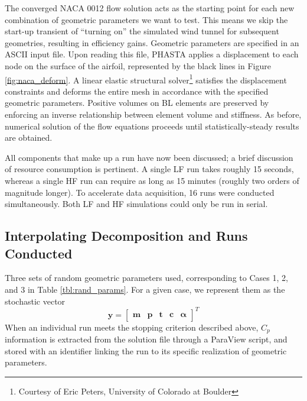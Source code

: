 \documentclass[11pt]{article}
\begin{document}
The converged NACA 0012 flow solution acts as the starting point for each new combination of geometric parameters we want to test. This means we skip the start-up transient of ``turning on'' the simulated wind tunnel for subsequent geometries, resulting in efficiency gains. Geometric parameters are specified in an ASCII input file. Upon reading this file, PHASTA applies a displacement to each node on the surface of the airfoil, represented by the black lines in Figure \ref{fig:naca_deform}. A linear elastic structural solver\footnote{Courtesy of Eric Peters, University of Colorado at Boulder} satisfies the displacement constraints and deforms the entire mesh in accordance with the specified geometric parameters. Positive volumes on BL elements are preserved by enforcing an inverse relationship between element volume and stiffness. As before, numerical solution of the flow equations proceeds until statistically-steady results are obtained.

All components that make up a run have now been discussed; a brief discussion of resource consumption is pertinent. A single LF run takes roughly 15 seconds, whereas a single HF run can require as long as 15 minutes (roughly two orders of magnitude longer). To accelerate data acquisition, 16 runs were conducted simultaneously. Both LF and HF simulations could only be run in serial.

\subsection{Interpolating Decomposition and Runs Conducted}

Three sets of random geometric parameters used, corresponding to Cases 1, 2, and 3 in Table \ref{tbl:rand_params}. For a given case, we represent them as the stochastic vector
\begin{equation}
\bm{y} = \begin{bmatrix}
\bm{m} & \bm{p} & \bm{t} & \bm{c} & \bm{\alpha}
\end{bmatrix}^T
\end{equation}
When an individual run meets the stopping criterion described above, $C_p$ information is extracted from the solution file through a ParaView script, and stored with an identifier linking the run to its specific realization of geometric parameters.
\end{document}

